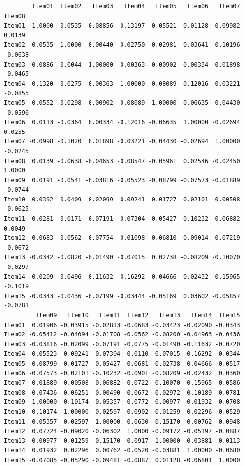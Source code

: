 \documentclass[
  a4paper,
]{ltjsbook}
\newenvironment{Shaded}{\begin{snugshade}}{\end{snugshade}}
\newcommand{\NormalTok}[1]{\textcolor[rgb]{0.00,0.23,0.31}{#1}}
\newcommand{\SpecialCharTok}[1]{\textcolor[rgb]{0.37,0.37,0.37}{#1}}
\begin{document}
\begin{Shaded}
\end{Shaded}

\begin{verbatim}
        Item01  Item02   Item03   Item04   Item05   Item06   Item07  Item08
Item01  1.0000 -0.0535 -0.08856 -0.13197  0.05521  0.01128 -0.09982  0.0139
Item02 -0.0535  1.0000  0.00440 -0.02750 -0.02981 -0.03641 -0.10196 -0.0638
Item03 -0.0886  0.0044  1.00000  0.00363  0.00902  0.00334  0.01898 -0.0465
Item04 -0.1320 -0.0275  0.00363  1.00000 -0.08089 -0.12016 -0.03221 -0.0855
Item05  0.0552 -0.0298  0.00902 -0.08089  1.00000 -0.06635 -0.04430 -0.0596
Item06  0.0113 -0.0364  0.00334 -0.12016 -0.06635  1.00000 -0.02694  0.0255
Item07 -0.0998 -0.1020  0.01898 -0.03221 -0.04430 -0.02694  1.00000 -0.0245
Item08  0.0139 -0.0638 -0.04653 -0.08547 -0.05961  0.02546 -0.02450  1.0000
Item09  0.0191 -0.0541 -0.03816 -0.05523 -0.08799 -0.07573 -0.01889 -0.0744
Item10 -0.0392 -0.0409 -0.02099 -0.09241 -0.01727 -0.02101  0.00508 -0.0625
Item11 -0.0281 -0.0171 -0.07191 -0.07304 -0.05427 -0.10232 -0.06882  0.0049
Item12 -0.0683 -0.0562 -0.07754 -0.01098 -0.06810 -0.09014 -0.07219 -0.0672
Item13 -0.0342 -0.0820 -0.01490 -0.07015  0.02738 -0.08209 -0.10070 -0.0297
Item14 -0.0209 -0.0496 -0.11632 -0.16292 -0.04666 -0.02432 -0.15965 -0.1019
Item15 -0.0343 -0.0436 -0.07199 -0.03444 -0.05169  0.03602 -0.05857 -0.0781
         Item09   Item10   Item11  Item12   Item13   Item14  Item15
Item01  0.01906 -0.03915 -0.02813 -0.0683 -0.03423 -0.02090 -0.0343
Item02 -0.05412 -0.04094 -0.01708 -0.0562 -0.08200 -0.04963 -0.0436
Item03 -0.03816 -0.02099 -0.07191 -0.0775 -0.01490 -0.11632 -0.0720
Item04 -0.05523 -0.09241 -0.07304 -0.0110 -0.07015 -0.16292 -0.0344
Item05 -0.08799 -0.01727 -0.05427 -0.0681  0.02738 -0.04666 -0.0517
Item06 -0.07573 -0.02101 -0.10232 -0.0901 -0.08209 -0.02432  0.0360
Item07 -0.01889  0.00508 -0.06882 -0.0722 -0.10070 -0.15965 -0.0586
Item08 -0.07436 -0.06251  0.00490 -0.0672 -0.02972 -0.10189 -0.0781
Item09  1.00000 -0.10174 -0.05357  0.0772 -0.00977  0.01932 -0.0708
Item10 -0.10174  1.00000 -0.02597 -0.0902  0.01259  0.02296 -0.0529
Item11 -0.05357 -0.02597  1.00000 -0.0630 -0.15170  0.00762 -0.0948
Item12  0.07724 -0.09020 -0.06302  1.0000 -0.09172 -0.05197 -0.0887
Item13 -0.00977  0.01259 -0.15170 -0.0917  1.00000 -0.03881  0.0113
Item14  0.01932  0.02296  0.00762 -0.0520 -0.03881  1.00000 -0.0680
Item15 -0.07085 -0.05290 -0.09481 -0.0887  0.01128 -0.06801  1.0000
\end{verbatim}
\end{document}
